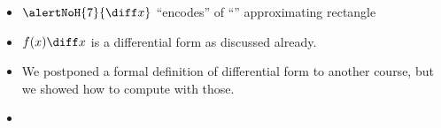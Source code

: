\begin{frame}
\begin{itemize}
\item<7-> $\alertNoH{7}{\diff x}$ ``encodes''   of ``'' approximating rectangle
\item<9-> $f(x) \diff x$ is a differential form as discussed already.
\item<10-> We postponed a formal definition of differential form to another course, but we showed how to compute with those.
\item<11->   
\end{itemize}
\end{frame}

